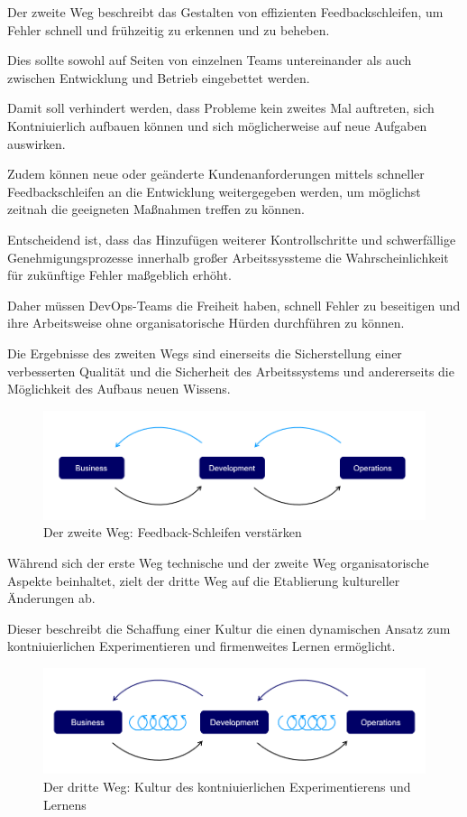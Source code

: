 Der zweite Weg beschreibt das Gestalten von effizienten Feedbackschleifen, um Fehler schnell und frühzeitig zu erkennen und zu beheben.

Dies sollte sowohl auf Seiten von einzelnen Teams untereinander als auch zwischen Entwicklung und Betrieb eingebettet werden.

Damit soll verhindert werden, dass Probleme kein zweites Mal auftreten, sich Kontniuierlich aufbauen können und sich möglicherweise auf neue Aufgaben auswirken. 

Zudem können neue oder geänderte Kundenanforderungen mittels schneller Feedbackschleifen an die Entwicklung weitergegeben werden, um möglichst zeitnah die geeigneten Maßnahmen treffen zu können.

Entscheidend ist, dass das Hinzufügen weiterer Kontrollschritte und schwerfällige Genehmigungsprozesse innerhalb großer Arbeitssyssteme die Wahrscheinlichkeit für zukünftige Fehler maßgeblich erhöht. 

Daher müssen DevOps-Teams die Freiheit haben, schnell Fehler zu beseitigen und ihre Arbeitsweise ohne organisatorische Hürden durchführen zu können.   

Die Ergebnisse des zweiten Wegs sind einerseits die Sicherstellung einer verbesserten Qualität und die Sicherheit des Arbeitssystems und andererseits die Möglichkeit des Aufbaus neuen Wissens.

\begin{figure}[h]
    \centering
    \includegraphics[scale=0.6]{Bilder/Second Way.png}
    \caption{Der zweite Weg: Feedback-Schleifen verstärken \cite{kim_three_2012}}
\end{figure}

Während sich der erste Weg technische und der zweite Weg organisatorische Aspekte beinhaltet, zielt der dritte Weg auf die Etablierung kultureller Änderungen ab. 

Dieser beschreibt die Schaffung einer Kultur die einen dynamischen Ansatz zum kontniuierlichen Experimentieren und firmenweites Lernen ermöglicht. 

\begin{figure}[h]
    \centering
    \includegraphics[scale=0.6]{Bilder/Third Way.png}
    \caption{Der dritte Weg: Kultur des kontniuierlichen Experimentierens und Lernens \cite{kim_three_2012}}
\end{figure}

